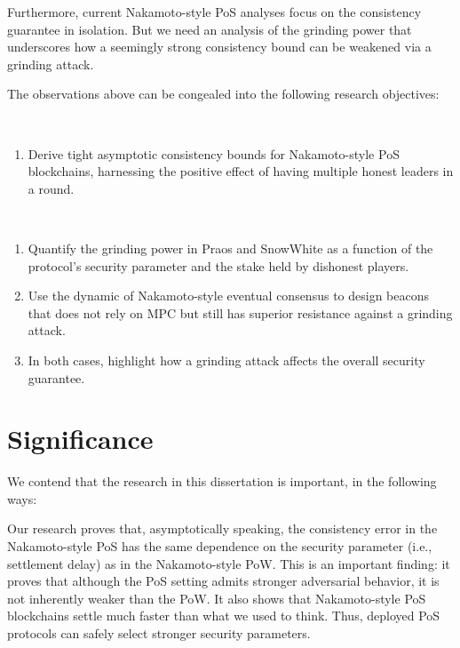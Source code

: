 Furthermore, 
current Nakamoto-style PoS analyses focus on the consistency guarantee in isolation. 
But we need an analysis of the grinding power that underscores 
how a seemingly strong consistency bound 
can be weakened via a grinding attack. 




The observations above can be congealed into the following research objectives:

\begin{description}[font=\normalfont\itshape\space]
  \item[Consistency Problem:]~
  \begin{enumerate}
    \item Derive tight asymptotic consistency bounds for Nakamoto-style PoS blockchains, 
    harnessing the positive effect of having multiple honest leaders in a round.

    \setcounter{ConsistencyObjectives}{\value{enumi}}
  \end{enumerate}

  \item[Grinding Problem:]~
  \begin{enumerate}
    \setcounter{enumi}{\value{ConsistencyObjectives}}

    \item Quantify the grinding power in Praos and SnowWhite 
    as a function of the protocol's security parameter and the 
    stake held by dishonest players.
    
    \item Use the dynamic of Nakamoto-style eventual consensus to design 
    beacons that does not rely on MPC but still has superior resistance 
    against a grinding attack.     

    \item In both cases, 
    highlight how a grinding attack affects the overall security guarantee.
  \end{enumerate}
\end{description}





\section{Significance}
We contend that the research in this dissertation is important, in the following ways:

  Our research proves that, asymptotically speaking, the consistency error 
  in the Nakamoto-style PoS has the same dependence on the security parameter 
  (i.e., settlement delay) 
  as in the Nakamoto-style PoW. 
  This is an important finding: 
  it proves that although the PoS setting 
  admits stronger adversarial behavior, 
  it is not inherently weaker than the PoW. 
  It also shows that Nakamoto-style PoS blockchains settle much faster than what we used to think. 
  Thus, deployed PoS protocols can safely select stronger security parameters. 

